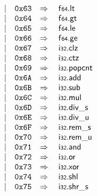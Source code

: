 $$\begin{array}[t]{@{}lrrl@{}l@{}l@{}l@{}}
& & | & \mathtt{0x63} & \quad\Rightarrow\quad{} & \mathsf{f{\scriptstyle 64}} {.} \mathsf{lt} \\
& & | & \mathtt{0x64} & \quad\Rightarrow\quad{} & \mathsf{f{\scriptstyle 64}} {.} \mathsf{gt} \\
& & | & \mathtt{0x65} & \quad\Rightarrow\quad{} & \mathsf{f{\scriptstyle 64}} {.} \mathsf{le} \\
& & | & \mathtt{0x66} & \quad\Rightarrow\quad{} & \mathsf{f{\scriptstyle 64}} {.} \mathsf{ge} \\
& & | & \mathtt{0x67} & \quad\Rightarrow\quad{} & \mathsf{i{\scriptstyle 32}} {.} \mathsf{clz} \\
& & | & \mathtt{0x68} & \quad\Rightarrow\quad{} & \mathsf{i{\scriptstyle 32}} {.} \mathsf{ctz} \\
& & | & \mathtt{0x69} & \quad\Rightarrow\quad{} & \mathsf{i{\scriptstyle 32}} {.} \mathsf{popcnt} \\
& & | & \mathtt{0x6A} & \quad\Rightarrow\quad{} & \mathsf{i{\scriptstyle 32}} {.} \mathsf{add} \\
& & | & \mathtt{0x6B} & \quad\Rightarrow\quad{} & \mathsf{i{\scriptstyle 32}} {.} \mathsf{sub} \\
& & | & \mathtt{0x6C} & \quad\Rightarrow\quad{} & \mathsf{i{\scriptstyle 32}} {.} \mathsf{mul} \\
& & | & \mathtt{0x6D} & \quad\Rightarrow\quad{} & \mathsf{i{\scriptstyle 32}} {.} {\mathsf{div}}{\mathsf{\_}}{\mathsf{s}} \\
& & | & \mathtt{0x6E} & \quad\Rightarrow\quad{} & \mathsf{i{\scriptstyle 32}} {.} {\mathsf{div}}{\mathsf{\_}}{\mathsf{u}} \\
& & | & \mathtt{0x6F} & \quad\Rightarrow\quad{} & \mathsf{i{\scriptstyle 32}} {.} {\mathsf{rem}}{\mathsf{\_}}{\mathsf{s}} \\
& & | & \mathtt{0x70} & \quad\Rightarrow\quad{} & \mathsf{i{\scriptstyle 32}} {.} {\mathsf{rem}}{\mathsf{\_}}{\mathsf{u}} \\
& & | & \mathtt{0x71} & \quad\Rightarrow\quad{} & \mathsf{i{\scriptstyle 32}} {.} \mathsf{and} \\
& & | & \mathtt{0x72} & \quad\Rightarrow\quad{} & \mathsf{i{\scriptstyle 32}} {.} \mathsf{or} \\
& & | & \mathtt{0x73} & \quad\Rightarrow\quad{} & \mathsf{i{\scriptstyle 32}} {.} \mathsf{xor} \\
& & | & \mathtt{0x74} & \quad\Rightarrow\quad{} & \mathsf{i{\scriptstyle 32}} {.} \mathsf{shl} \\
& & | & \mathtt{0x75} & \quad\Rightarrow\quad{} & \mathsf{i{\scriptstyle 32}} {.} {\mathsf{shr}}{\mathsf{\_}}{\mathsf{s}} \\

\end{array}$$
